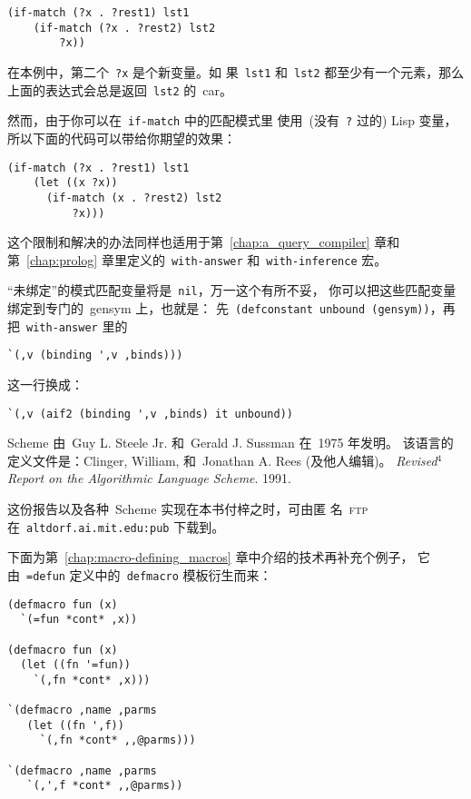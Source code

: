 \begin{notes}
\begin{verbatim}
(if-match (?x . ?rest1) lst1
    (if-match (?x . ?rest2) lst2
        ?x))
\end{verbatim}

在本例中，第二个~\texttt{?x} 是个新变量。如
果~\texttt{lst1} 和~\texttt{lst2} 都至少有一个元素，那么上面的表达式会总是返回~\texttt{lst2} 的~car。

然而，由于你可以在~\texttt{if-match} 中的匹配模式里
使用~(没有~\texttt{?} 过的) Lisp 变量，所以下面的代码可以带给你期望的效果：
\begin{verbatim}
(if-match (?x . ?rest1) lst1
    (let ((x ?x))
      (if-match (x . ?rest2) lst2
          ?x)))
\end{verbatim}

这个限制和解决的办法同样也适用于第~\ref{chap:a_query_compiler} 章和
第~\ref{chap:prolog} 章里定义的~\texttt{with-answer} 和~\texttt{with-inference} 宏。


``未绑定''的模式匹配变量将是~\texttt{nil}，万一这个有所不妥，
你可以把这些匹配变量绑定到专门的~gensym 上，也就是：
先~\texttt{(defconstant unbound (gensym))}，再把~\texttt{with-answer} 里的
\begin{verbatim}
`(,v (binding ',v ,binds)))
\end{verbatim}
这一行换成：
\begin{verbatim}
`(,v (aif2 (binding ',v ,binds) it unbound))
\end{verbatim}

  Scheme 由~Guy L. Steele Jr. 和~Gerald J. Sussman 在~1975 年发明。
  该语言的定义文件是：Clinger, William, 和~Jonathan A. Rees (及他人编辑)。
  \emph{Revised$^4$ Report on the Algorithmic Language Scheme}. 1991.  

  这份报告以及各种~Scheme 实现在本书付梓之时，可由匿
  名~\textsc{ftp} 在~\texttt{altdorf.ai.mit.edu:pub} 下载到。

  下面为第~\ref{chap:macro-defining_macros} 章中介绍的技术再补充个例子，
  它由~\texttt{=defun} 定义中的~\texttt{defmacro} 模板衍生而来：
\begin{verbatim}
(defmacro fun (x)
  `(=fun *cont* ,x))

(defmacro fun (x)
  (let ((fn '=fun))
    `(,fn *cont* ,x)))

`(defmacro ,name ,parms
   (let ((fn ',f))
     `(,fn *cont* ,,@parms)))

`(defmacro ,name ,parms
   `(,',f *cont* ,,@parms))
\end{verbatim}


\end{notes}
